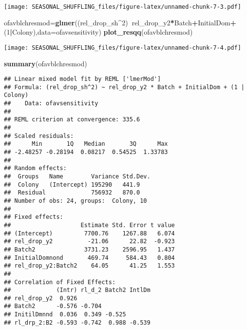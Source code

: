 \documentclass[]{article}
\newenvironment{Shaded}{\begin{snugshade}}{\end{snugshade}}
\newcommand{\DataTypeTok}[1]{\textcolor[rgb]{0.13,0.29,0.53}{#1}}
\newcommand{\DecValTok}[1]{\textcolor[rgb]{0.00,0.00,0.81}{#1}}
\newcommand{\KeywordTok}[1]{\textcolor[rgb]{0.13,0.29,0.53}{\textbf{#1}}}
\newcommand{\NormalTok}[1]{#1}
\newcommand{\OperatorTok}[1]{\textcolor[rgb]{0.81,0.36,0.00}{\textbf{#1}}}
\newcommand{\StringTok}[1]{\textcolor[rgb]{0.31,0.60,0.02}{#1}}
\begin{document}
\begin{Shaded}
\end{Shaded}

\texttt{[image: SEASONAL\_SHUFFLING\_files/figure-latex/unnamed-chunk-7-3.pdf]}

\begin{Shaded}
\begin{Highlighting}[]
\NormalTok{ofavblchresmod=}\KeywordTok{glmer}\NormalTok{((rel_drop_sh}\OperatorTok{^}\DecValTok{2}\NormalTok{)}\OperatorTok{~}\NormalTok{rel_drop_y2}\OperatorTok{*}\NormalTok{Batch}\OperatorTok{+}\NormalTok{InitialDom}\OperatorTok{+}\NormalTok{(}\DecValTok{1}\OperatorTok{|}\NormalTok{Colony),}\DataTypeTok{data=}\NormalTok{ofavsensitivity)}
\KeywordTok{plot_resqq}\NormalTok{(ofavblchresmod)}
\end{Highlighting}
\end{Shaded}

\texttt{[image: SEASONAL\_SHUFFLING\_files/figure-latex/unnamed-chunk-7-4.pdf]}

\begin{Shaded}
\begin{Highlighting}[]
\KeywordTok{summary}\NormalTok{(ofavblchresmod)}
\end{Highlighting}
\end{Shaded}

\begin{verbatim}
## Linear mixed model fit by REML ['lmerMod']
## Formula: (rel_drop_sh^2) ~ rel_drop_y2 * Batch + InitialDom + (1 | Colony)
##    Data: ofavsensitivity
## 
## REML criterion at convergence: 335.6
## 
## Scaled residuals: 
##      Min       1Q   Median       3Q      Max 
## -2.48257 -0.28194  0.08217  0.54525  1.33783 
## 
## Random effects:
##  Groups   Name        Variance Std.Dev.
##  Colony   (Intercept) 195290   441.9   
##  Residual             756932   870.0   
## Number of obs: 24, groups:  Colony, 10
## 
## Fixed effects:
##                    Estimate Std. Error t value
## (Intercept)         7700.76    1267.88   6.074
## rel_drop_y2          -21.06      22.82  -0.923
## Batch2              3731.23    2596.95   1.437
## InitialDomnond       469.74     584.43   0.804
## rel_drop_y2:Batch2    64.05      41.25   1.553
## 
## Correlation of Fixed Effects:
##             (Intr) rl_d_2 Batch2 IntlDm
## rel_drop_y2  0.926                     
## Batch2      -0.576 -0.704              
## InitilDmnnd  0.036  0.349 -0.525       
## rl_drp_2:B2 -0.593 -0.742  0.988 -0.539
\end{verbatim}
\end{document}
